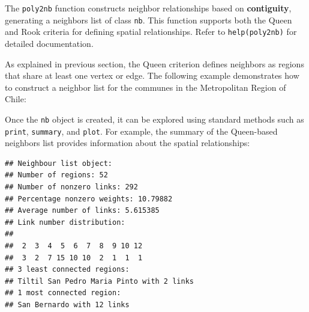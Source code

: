 The \texttt{poly2nb} function constructs neighbor relationships based on \textbf{contiguity}, generating a neighbors list of class \texttt{nb}. This function supports both the Queen and Rook criteria for defining spatial relationships. Refer to \texttt{help(poly2nb)} for detailed documentation.


As explained in previous section, the Queen criterion defines neighbors as regions that share at least one vertex or edge. The following example demonstrates how to construct a neighbor list for the communes in the Metropolitan Region of Chile:

\begin{knitrout}
\color{fgcolor}\begin{kframe}
\begin{alltt}
\hldef{(}\hldef{)}
 \hlkwb{<-} \hldef{(} \hldef{),}  \hldef{=}  \hldef{,}  \hlopt{$}
\end{alltt}
\end{kframe}
\end{knitrout}

Once the \texttt{nb} object is created, it can be explored using standard methods such as \texttt{print}, \texttt{summary}, and \texttt{plot}. For example, the summary of the Queen-based neighbors list provides information about the spatial relationships:
\begin{knitrout}
\color{fgcolor}\begin{kframe}
\begin{alltt}
\end{alltt}
\begin{verbatim}
## Neighbour list object:
## Number of regions: 52 
## Number of nonzero links: 292 
## Percentage nonzero weights: 10.79882 
## Average number of links: 5.615385 
## Link number distribution:
## 
##  2  3  4  5  6  7  8  9 10 12 
##  3  2  7 15 10 10  2  1  1  1 
## 3 least connected regions:
## Tiltil San Pedro Maria Pinto with 2 links
## 1 most connected region:
## San Bernardo with 12 links
\end{verbatim}
\end{kframe}
\end{knitrout}

